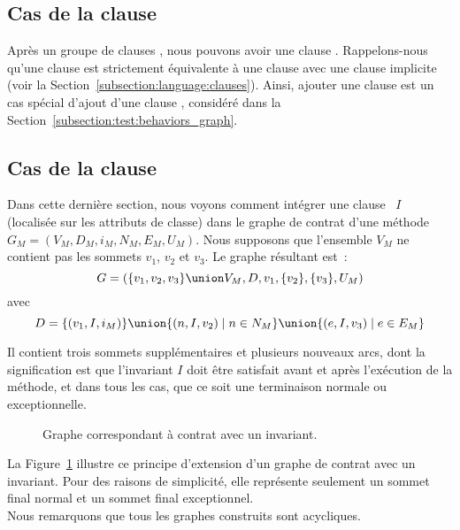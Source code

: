 \subsection{Cas de la clause \adefault}
\label{subsection:test:default_graph}

Après un groupe de clauses \abehavior, nous pouvons avoir une clause \adefault.
Rappelons-nous qu'une clause \adefault est strictement équivalente à une clause
\abehavior avec une clause \arequires implicite (voir la
Section~\ref{subsection:language:clauses}). Ainsi, ajouter une clause \adefault
est un cas spécial d'ajout d'une clause \abehavior, considéré dans la
Section~\ref{subsection:test:behaviors_graph}.

\subsection{Cas de la clause \ainvariant}
\label{subsection:test:invariant_graph}

Dans cette dernière section, nous voyons comment intégrer une clause
\ainvariant~$I$ (localisée sur les attributs de classe) dans le graphe de
contrat d'une méthode $G_M = (V_M, D_M, i_M, N_M, E_M, U_M)$. Nous supposons que
l'ensemble $V_M$ ne contient pas les sommets $v_1$, $v_2$ et $v_3$. Le graphe
résultant est~:
%
$$G = (
  \{v_1, v_2, v_3\} \union V_M,
  D,
  v_1,
  \{v_2\},
  \{v_3\},
  U_M
)$$
%
avec
%
$$D = \{(v_1, I, i_M)\} \union
      \{(n, I, v_2) \;\vert\; n \in N_M\} \union
      \{(e, I, v_3) \;\vert\; e \in E_M\}$$

Il contient trois sommets supplémentaires et plusieurs nouveaux arcs, dont la
signification est que l'invariant $I$ doit être satisfait avant et après
l'exécution de la méthode, et dans tous les cas, que ce soit une terminaison
normale ou exceptionnelle.

\begin{figure}


\caption{\label{figure:test:invariant_graph} Graphe correspondant à contrat avec
un invariant.}

\end{figure}

La Figure~\ref{figure:test:invariant_graph} illustre ce principe d'extension
d'un graphe de contrat avec un invariant. Pour des raisons de simplicité, elle
représente seulement un sommet final normal et un sommet final exceptionnel. \\

Nous remarquons que tous les graphes construits sont acycliques.
